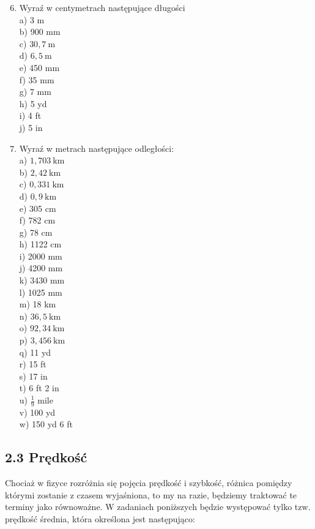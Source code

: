 \documentclass[10pt]{article}
\begin{document}
\begin{enumerate}
  \setcounter{enumi}{5}
  \item Wyraź w centymetrach następujące długości\\
a) 3 m\\
b) 900 mm\\
c) \(30,7 \mathrm{~m}\)\\
d) \(6,5 \mathrm{~m}\)\\
e) 450 mm\\
f) 35 mm\\
g) 7 mm\\
h) 5 yd\\
i) 4 ft\\
j) 5 in
  \item Wyraź w metrach następujące odległości:\\
a) \(1,703 \mathrm{~km}\)\\
b) \(2,42 \mathrm{~km}\)\\
c) \(0,331 \mathrm{~km}\)\\
d) \(0,9 \mathrm{~km}\)\\
e) 305 cm\\
f) 782 cm\\
g) 78 cm\\
h) 1122 cm\\
i) 2000 mm\\
j) 4200 mm\\
k) 3430 mm\\
l) 1025 mm\\
m) 18 km\\
n) \(36,5 \mathrm{~km}\)\\
o) \(92,34 \mathrm{~km}\)\\
p) \(3,456 \mathrm{~km}\)\\
q) 11 yd\\
r) 15 ft\\
s) 17 in\\
t) 6 ft 2 in\\
u) \(\frac{1}{9}\) mile\\
v) 100 yd\\
w) 150 yd 6 ft
\end{enumerate}

\subsection*{2.3 Prędkość}
Chociaż w fizyce rozróżnia się pojęcia prędkość i szybkość, różnica pomiędzy którymi zostanie z czasem wyjaśniona, to my na razie, będziemy traktować te terminy jako równoważne. W zadaniach poniższych będzie występować tylko tzw. prędkość średnia, która określona jest następująco:
\end{document}
